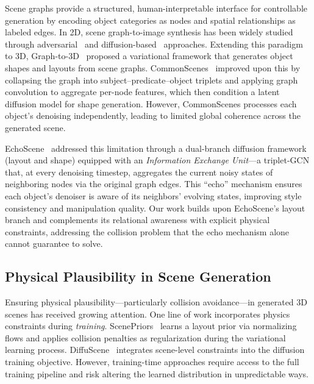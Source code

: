Scene graphs provide a structured, human-interpretable interface for controllable generation by encoding object categories as nodes and spatial relationships as labeled edges.
In 2D, scene graph-to-image synthesis has been widely studied through adversarial~\cite{placeholder_sg2im, placeholder_canonical_sg2im} and diffusion-based~\cite{placeholder_sgdiff_2d} approaches.
Extending this paradigm to 3D, Graph-to-3D~\cite{placeholder_graph2threed} proposed a variational framework that generates object shapes and layouts from scene graphs.
CommonScenes~\cite{placeholder_commonscenes} improved upon this by collapsing the graph into subject--predicate--object triplets and applying graph convolution to aggregate per-node features, which then condition a latent diffusion model for shape generation.
However, CommonScenes processes each object's denoising independently, leading to limited global coherence across the generated scene.

EchoScene~\cite{echoscene} addressed this limitation through a dual-branch diffusion framework (layout and shape) equipped with an \emph{Information Exchange Unit}---a triplet-GCN that, at every denoising timestep, aggregates the current noisy states of neighboring nodes via the original graph edges.
This ``echo'' mechanism ensures each object's denoiser is aware of its neighbors' evolving states, improving style consistency and manipulation quality.
Our work builds upon EchoScene's layout branch and complements its relational awareness with explicit physical constraints, addressing the collision problem that the echo mechanism alone cannot guarantee to solve.

\subsection{Physical Plausibility in Scene Generation}
\label{sec:related:physical}

Ensuring physical plausibility---particularly collision avoidance---in generated 3D scenes has received growing attention.
One line of work incorporates physics constraints during \emph{training}.
ScenePriors~\cite{placeholder_scenepriors} learns a layout prior via normalizing flows and applies collision penalties as regularization during the variational learning process.
DiffuScene~\cite{placeholder_diffuscene} integrates scene-level constraints into the diffusion training objective.
However, training-time approaches require access to the full training pipeline and risk altering the learned distribution in unpredictable ways.

